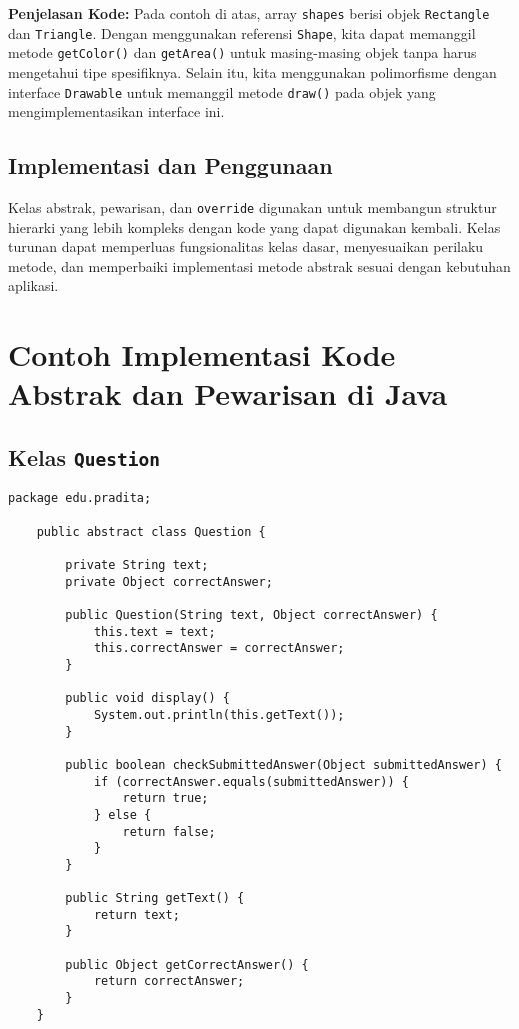 \textbf{Penjelasan Kode:}
Pada contoh di atas, array \texttt{shapes} berisi objek \texttt{Rectangle} dan \texttt{Triangle}. Dengan menggunakan referensi \texttt{Shape}, kita dapat memanggil metode \texttt{getColor()} dan \texttt{getArea()} untuk masing-masing objek tanpa harus mengetahui tipe spesifiknya. Selain itu, kita menggunakan polimorfisme dengan interface \texttt{Drawable} untuk memanggil metode \texttt{draw()} pada objek yang mengimplementasikan interface ini.


\subsection{Implementasi dan Penggunaan}

Kelas abstrak, pewarisan, dan \texttt{override} digunakan untuk membangun struktur hierarki yang lebih kompleks dengan kode yang dapat digunakan kembali. Kelas turunan dapat memperluas fungsionalitas kelas dasar, menyesuaikan perilaku metode, dan memperbaiki implementasi metode abstrak sesuai dengan kebutuhan aplikasi.

\section{Contoh Implementasi Kode Abstrak dan Pewarisan di Java}

\subsection{Kelas \texttt{Question}}

\begin{lstlisting}[style=JavaStyle]
	package edu.pradita;
	
	public abstract class Question {
		
		private String text;
		private Object correctAnswer;
		
		public Question(String text, Object correctAnswer) {
			this.text = text;
			this.correctAnswer = correctAnswer;
		}
		
		public void display() {
			System.out.println(this.getText());
		}
		
		public boolean checkSubmittedAnswer(Object submittedAnswer) {
			if (correctAnswer.equals(submittedAnswer)) {
				return true;
			} else {
				return false;
			}
		}
		
		public String getText() {
			return text;
		}
		
		public Object getCorrectAnswer() {
			return correctAnswer;
		}
	}
\end{lstlisting}

